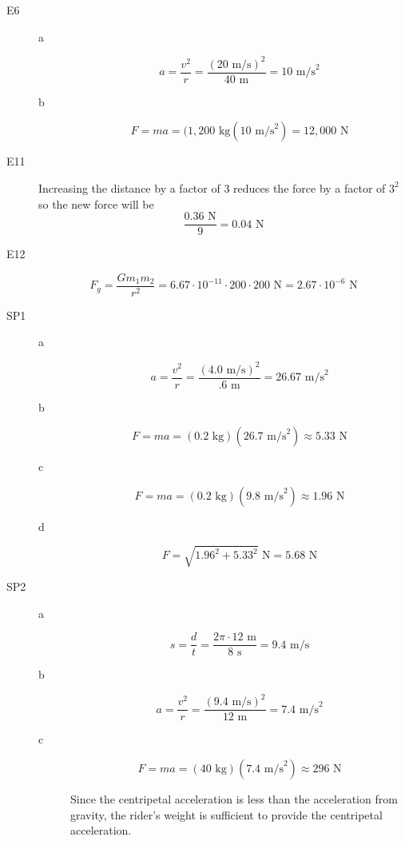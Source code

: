 \documentclass{exam}
\begin{document}
\begin{description}
\item[E6]
\begin{description}
\item[a]
\[
  a = \frac{v^2}{r} = \frac{(20 \text{ m/s})^2}{40 \text{ m}} = 10 \text{ m/s}^2
\]

\item[b]
\[
  F = ma = (1,200 \text{ kg}(10 \text{ m/s}^2) = 12,000 \text{ N}
\]

\end{description}

\item[E11]
Increasing the distance by a factor of 3 reduces the force by a factor of $3^2$ so the new force will be 
\[
  \frac{0.36 \text{ N}}{9} = 0.04 \text{ N}
\]

\item[E12]
\[
  F_g = \frac{Gm_1m_2}{r^2} = 6.67 \cdot 10^{-11} \cdot 200 \cdot 200 \text{ N} = 2.67 \cdot 10^{-6} \text{ N}
\]

\item[SP1]
\begin{description}
\item[a]
\[
  a = \frac{v^2}{r} = \frac{(4.0 \text{ m/s})^2}{.6 \text{ m}} = 26.67 \text{ m/s}^2
\]

\item[b]
\[
  F = ma = (0.2 \text{ kg})(26.7 \text{ m/s}^2) \approx 5.33 \text{ N}
\]

\item[c]
\[
 F = ma =  (0.2 \text{ kg})(9.8 \text{ m/s}^2) \approx 1.96 \text{ N}
\]

\item[d]
\[
  F = \sqrt{1.96^2 + 5.33^2} \text{ N} = 5.68 \text{ N}
\]
\end{description}

\item[SP2]
\begin{description}
\item[a]
\[
  s = \frac{d}{t} = \frac{2 \pi \cdot 12 \text{ m}}{8 \text{ s}} = 9.4 \text{ m/s}
\]

\item[b]
\[
 a = \frac{v^2}{r} = \frac{(9.4 \text{ m/s})^2}{12 \text{ m}} = 7.4 \text{ m/s}^2
\]

\item[c]
\[
  F = ma = (40 \text{ kg})(7.4 \text{ m/s}^2) \approx 296 \text{ N}
\]

Since the centripetal acceleration is less than the acceleration from gravity, the rider's weight is sufficient to
provide the centripetal acceleration.


\end{description}
\end{description}
\end{document}

